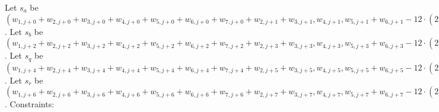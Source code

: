 Let $s_a$  be $(w_{1, j + 0} + w_{2, j + 0} + w_{3, j + 0} + w_{4, j + 0} + w_{5, j + 0} + w_{6, j + 0} + w_{7, j + 0} + w_{2, j + 1} + w_{3, j + 1}, w_{4, j + 1}, w_{5, j + 1} + w_{6, j + 1} - 12 \cdot (2^20 - 1))$.
Let $s_b$  be $(w_{1, j + 2} + w_{2, j + 2} + w_{3, j + 2} + w_{4, j + 2} + w_{5, j + 2} + w_{6, j + 2} + w_{7, j + 2} + w_{2, j + 3} + w_{3, j + 3}, w_{4, j + 3}, w_{5, j + 3} + w_{6, j + 3} - 12 \cdot (2^20 - 1))$.
Let $s_q$  be $(w_{1, j + 4} + w_{2, j + 4} + w_{3, j + 4} + w_{4, j + 4} + w_{5, j + 4} + w_{6, j + 4} + w_{7, j + 4} + w_{2, j + 5} + w_{3, j + 5}, w_{4, j + 5}, w_{5, j + 5} + w_{6, j + 5} - 12 \cdot (2^20 - 1))$.
Let $s_r$  be $(w_{1, j + 6} + w_{2, j + 6} + w_{3, j + 6} + w_{4, j + 6} + w_{5, j + 6} + w_{6, j + 6} + w_{7, j + 6} + w_{2, j + 7} + w_{3, j + 7}, w_{4, j + 7}, w_{5, j + 7} + w_{6, j + 7} - 12 \cdot (2^20 - 1))$.
Constraints:

